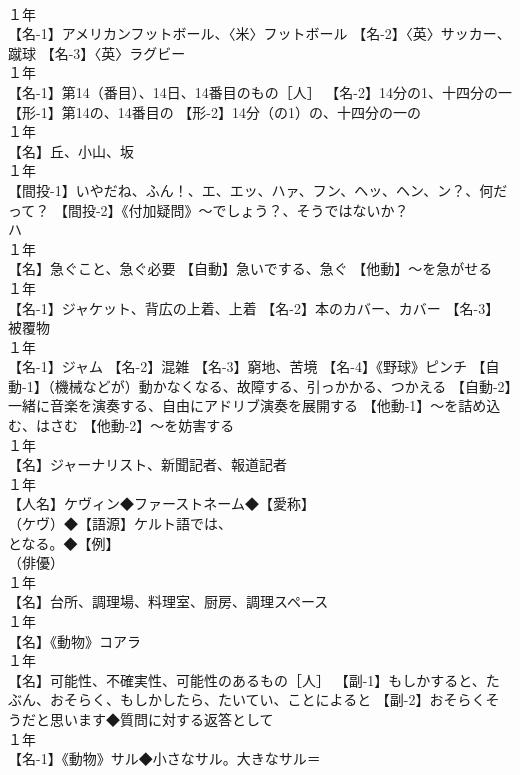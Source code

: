 \documentclass[8pt]{extreport}
\begin{document}
\begin{CJK}{UTF8}{min}
\\	１年	
\\	【名-1】アメリカンフットボール、〈米〉フットボール 【名-2】〈英〉サッカー、蹴球 【名-3】〈英〉ラグビー
\\	１年	
\\	【名-1】第14（番目）、14日、14番目のもの［人］ 【名-2】14分の1、十四分の一 【形-1】第14の、14番目の 【形-2】14分（の1）の、十四分の一の
\\	１年	
\\	【名】丘、小山、坂
\\	１年	
\\	【間投-1】いやだね、ふん！、エ、エッ、ハァ、フン、ヘッ、ヘン、ン？、何だって？ 【間投-2】《付加疑問》～でしょう？、そうではないか？ 
\\	ハ
\\	１年	
\\	【名】急ぐこと、急ぐ必要 【自動】急いでする、急ぐ 【他動】～を急がせる
\\	１年	
\\	【名-1】ジャケット、背広の上着、上着 【名-2】本のカバー、カバー 【名-3】被覆物
\\	１年	
\\	【名-1】ジャム 【名-2】混雑 【名-3】窮地、苦境 【名-4】《野球》ピンチ 【自動-1】（機械などが）動かなくなる、故障する、引っかかる、つかえる 【自動-2】一緒に音楽を演奏する、自由にアドリブ演奏を展開する 【他動-1】～を詰め込む、はさむ 【他動-2】～を妨害する
\\	１年	
\\	【名】ジャーナリスト、新聞記者、報道記者
\\	１年	
\\	【人名】ケヴィン◆ファーストネーム◆【愛称】
\\	（ケヴ）◆【語源】ケルト語では、
\\	となる。◆【例】
\\	（俳優）
\\	１年	
\\	【名】台所、調理場、料理室、厨房、調理スペース
\\	１年	
\\	【名】《動物》コアラ
\\	１年	
\\	【名】可能性、不確実性、可能性のあるもの［人］ 【副-1】もしかすると、たぶん、おそらく、もしかしたら、たいてい、ことによると 【副-2】おそらくそうだと思います◆質問に対する返答として
\\	１年	
\\	【名-1】《動物》サル◆小さなサル。大きなサル＝

\end{CJK}
\end{document}
